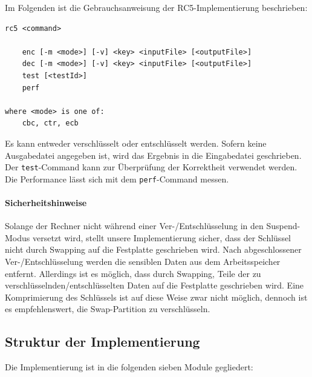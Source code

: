 \documentclass[course=erap]{aspdoc}
\begin{document}
Im Folgenden ist die Gebrauchsanweisung der RC5-Implementierung beschrieben:

\begin{samepage}
\begin{verbatim}
rc5 <command>

    enc [-m <mode>] [-v] <key> <inputFile> [<outputFile>]
    dec [-m <mode>] [-v] <key> <inputFile> [<outputFile>]
    test [<testId>]
    perf

where <mode> is one of:
    cbc, ctr, ecb
\end{verbatim}
\end{samepage}

Es kann entweder verschlüsselt oder entschlüsselt werden. Sofern keine Ausgabedatei angegeben ist, wird das Ergebnis in die Eingabedatei geschrieben. Der \texttt{test}-Command kann zur Überprüfung der Korrektheit verwendet werden. Die Performance lässt sich mit dem \texttt{perf}-Command messen.

\paragraph{Sicherheitshinweise} Solange der Rechner nicht während einer Ver-/Entschlüsselung in den Suspend-Modus versetzt wird, stellt unsere Implementierung sicher, dass der Schlüssel nicht durch Swapping auf die Festplatte geschrieben wird. Nach abgeschlossener Ver-/Entschlüsselung werden die sensiblen Daten aus dem Arbeitsspeicher entfernt. Allerdings ist es möglich, dass durch Swapping, Teile der zu verschlüsselnden/entschlüsselten Daten auf die Festplatte geschrieben wird. Eine Komprimierung des Schlüssels ist auf diese Weise zwar nicht möglich, dennoch ist es empfehlenswert, die Swap-Partition zu verschlüsseln.

\subsection{Struktur der Implementierung}

Die Implementierung ist in die folgenden sieben Module gegliedert:
\end{document}
